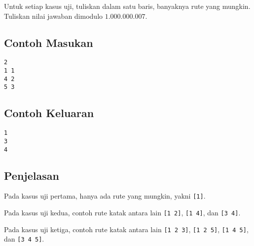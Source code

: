 \documentclass{article}
\begin{document}
Untuk setiap kasus uji, tuliskan dalam satu baris, banyaknya rute yang mungkin. Tuliskan nilai jawaban dimodulo $1.000.000.007$.

\begin{multicols}{2}
\subsection*{Contoh Masukan}
\begin{lstlisting}
2
1 1
4 2
5 3
\end{lstlisting}
\columnbreak
\subsection*{Contoh Keluaran}
\begin{lstlisting}
1
3
4
\end{lstlisting}
\vfill
\null
\end{multicols}

\subsection*{Penjelasan}

Pada kasus uji pertama, hanya ada rute yang mungkin, yakni \lstinline{[1]}.

Pada kasus uji kedua, contoh rute katak antara lain \lstinline{[1 2]}, \lstinline{[1 4]}, dan \lstinline{[3 4]}.

Pada kasus uji ketiga, contoh rute katak antara lain \lstinline{[1 2 3]}, \lstinline{[1 2 5]}, \lstinline{[1 4 5]}, dan \lstinline{[3 4 5]}.

\pagebreak
\end{document}
